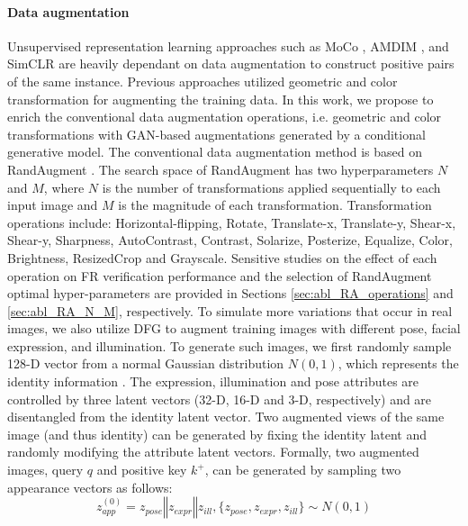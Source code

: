 \documentclass[10pt,twocolumn,letterpaper]{ieeeconf}
\begin{document}
\paragraph{Data augmentation}
\label{sec:data_augmentation}
Unsupervised representation learning approaches such as MoCo \cite{Moco}, AMDIM \cite{DBLP:conf/nips/BachmanHB19}, and SimCLR \cite{DBLP:conf/icml/ChenK0H20} are heavily dependant on data augmentation to construct positive pairs of the same instance. Previous approaches \cite{DBLP:conf/icml/ChenK0H20,DBLP:conf/nips/BachmanHB19,Moco} utilized geometric and color transformation for augmenting the training data. 
In this work, we propose to enrich the conventional data augmentation operations, i.e. geometric and color transformations with GAN-based augmentations generated by a conditional generative model.
The conventional data augmentation method is based on RandAugment \cite{Randaugment}. The search space of RandAugment has two hyperparameters $N$ and $M$, where $N$ is the number of transformations applied sequentially to each input image and $M$ is the magnitude of each transformation. 
Transformation operations include: Horizontal-flipping, Rotate, Translate-x, Translate-y, Shear-x, Shear-y, Sharpness, AutoContrast, Contrast, Solarize, Posterize, Equalize, Color, Brightness, ResizedCrop and Grayscale. Sensitive studies on the effect of each operation on FR verification performance and the selection of RandAugment optimal hyper-parameters are provided in Sections \ref{sec:abl_RA_operations} and \ref{sec:abl_RA_N_M}, respectively.
To simulate more variations that occur in real images, we also utilize DFG \cite{DiscoFaceGAN} to augment training images with different pose, facial expression, and illumination. 
To generate such images, we first randomly sample 128-D vector from a normal Gaussian distribution $N(0,1)$, which represents the identity information \cite{DiscoFaceGAN}. 
The expression, illumination and pose attributes are controlled by three latent vectors (32-D, 16-D and 3-D, respectively) and are disentangled from the identity latent vector. Two augmented views of the same image (and thus identity) can be generated by fixing the identity latent and randomly modifying the attribute latent vectors. Formally, two augmented images, query $q$ and positive key $k^+$, can be generated by sampling two appearance vectors as follows:
\begin{equation}
    z_{app}^{(0)} = z_{pose}\mathbin\Vert z_{expr}\mathbin\Vert z_{ill}, \{z_{pose}, z_{expr},  z_{ill}\} \sim N(0,1)
\end{equation}
\end{document}
